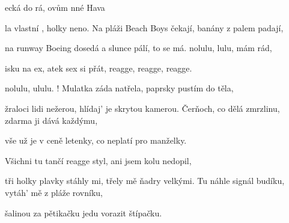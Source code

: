 

\zs

ecká  do rá, 
ovům nné Hava 

la  vlastní ,
 holky  neno.   
\ks
\zs
Na pláži Beach Boys čekají,
banány z palem padají,

na runway Boeing dosedá
a slunce pálí, to se má.
\ks
\zr
{}nolulu, lulu,  mám rád,

isku na ex, atek sex si  přát, reagge, reagge, reagge.

nolulu, ululu. !
\kr
\zs
Mulatka záda natřela,
paprsky pustím do těla,

žraloci lidi nežerou,
hlídaj' je skrytou kamerou.
\ks
\zs
Čerňoch, co dělá zmrzlinu,
zdarma ji dává každýmu,

vše už je v ceně letenky,
co neplatí pro manželky.
\ks

\zr
\kr

\zs
Všichni tu tančí reagge styl,
ani jsem kolu nedopil,

tři holky plavky stáhly mi,
třely mě ňadry velkými.
\ks
\zs
Tu náhle signál budíku,
vytáh' mě z pláže rovníku,

šalinou za pětikačku
jedu vorazit štípačku.
\ks

\zr
\kr

\kp





